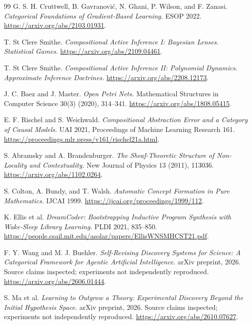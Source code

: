 \documentclass[11pt]{article}
\theoremstyle{definition}
\begin{document}
\begin{thebibliography}{99}
G. S. H. Cruttwell, B. Gavranovi\'{c}, N. Ghani, P. Wilson, and F. Zanasi.
\emph{Categorical Foundations of Gradient-Based Learning.}
ESOP 2022.
\url{https://arxiv.org/abs/2103.01931}.

T. St Clere Smithe.
\emph{Compositional Active Inference I: Bayesian Lenses. Statistical Games.}
\url{https://arxiv.org/abs/2109.04461}.

T. St Clere Smithe.
\emph{Compositional Active Inference II: Polynomial Dynamics. Approximate Inference Doctrines.}
\url{https://arxiv.org/abs/2208.12173}.

J. C. Baez and J. Master. \emph{Open Petri Nets.}
Mathematical Structures in Computer Science 30(3) (2020), 314--341.
\url{https://arxiv.org/abs/1808.05415}.

E. F. Rischel and S. Weichwald.
\emph{Compositional Abstraction Error and a Category of Causal Models.}
UAI 2021, Proceedings of Machine Learning Research 161.
\url{https://proceedings.mlr.press/v161/rischel21a.html}.

S. Abramsky and A. Brandenburger.
\emph{The Sheaf-Theoretic Structure of Non-Locality and Contextuality.}
New Journal of Physics 13 (2011), 113036.
\url{https://arxiv.org/abs/1102.0264}.

S. Colton, A. Bundy, and T. Walsh.
\emph{Automatic Concept Formation in Pure Mathematics.}
IJCAI 1999.
\url{https://ijcai.org/proceedings/1999/112}.

K. Ellis et al.
\emph{DreamCoder: Bootstrapping Inductive Program Synthesis with Wake-Sleep Library Learning.}
PLDI 2021, 835--850.
\url{https://people.csail.mit.edu/asolar/papers/EllisWNSMHCST21.pdf}.

F. Y. Wang and M. J. Buehler.
\emph{Self-Revising Discovery Systems for Science: A Categorical Framework for Agentic Artificial Intelligence.}
arXiv preprint, 2026. Source claims inspected; experiments not independently reproduced.
\url{https://arxiv.org/abs/2606.01444}.

S. Ma et al.
\emph{Learning to Outgrow a Theory: Experimental Discovery Beyond the Initial Hypothesis Space.}
arXiv preprint, 2026. Source claims inspected; experiments not independently reproduced.
\url{https://arxiv.org/abs/2610.07627}.

\end{thebibliography}
\end{document}
